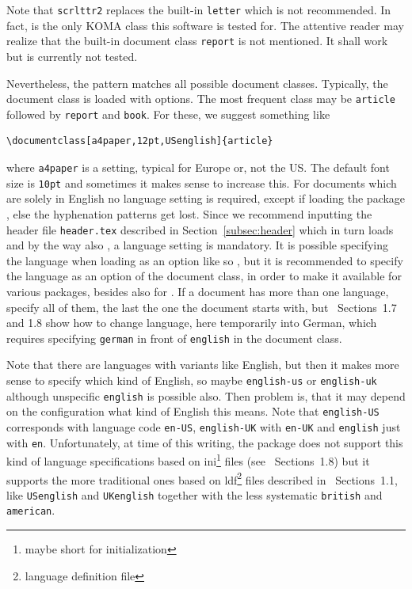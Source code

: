 Note that \texttt{scrlttr2} replaces the built-in \texttt{letter} which is not recommended. 
In fact, is the only KOMA class this software is tested for. 
The attentive reader may realize 
that the built-in document class \texttt{report} is not mentioned. 
It shall work but is currently not tested. 

Nevertheless, the pattern  
matches all possible document classes. 
Typically, the document class is loaded with options. 
The most frequent class may be \texttt{article} 
followed by \texttt{report} and \texttt{book}. 
For these, we suggest something like 
%
\begin{Verbatim}
\documentclass[a4paper,12pt,USenglish]{article}
\end{Verbatim}
%
where \texttt{a4paper} is a setting, typical for Europe or, not the US\@. 
The default font size is \texttt{10pt} and sometimes it makes sense to increase this. 
For documents which are solely in English no language setting is required, 
except if loading the package , else the hyphenation patterns get lost. 
Since we recommend inputting the header file \texttt{header.tex} 
described in Section~\ref{subsec:header} which in turn loads  and 
by the way also , a language setting is mandatory. 
It is possible specifying the language when loading  as an option 
like so , 
but it is recommended to specify the language as an option of the document class, 
in order to make it available for various packages, 
besides  also for . 
If a document has more than one language, specify all of them, 
the last the one the document starts with, 
but~\cite{BabelP24} Sections~1.7 and 1.8 show how to change language, 
here temporarily into German, 
which requires specifying \texttt{german} in front of \texttt{english} 
in the document class. 

Note that there are languages with variants like English, 
but then it makes more sense to specify which kind of English, 
so maybe \texttt{english-us} or \texttt{english-uk} 
although unspecific \texttt{english} is possible also. 
Then problem is, that it may depend on the configuration what kind of English this means. 
Note that \texttt{english-US} corresponds with language code \texttt{en-US}, 
\texttt{english-UK} with \texttt{en-UK} and \texttt{english} just with \texttt{en}. 
Unfortunately, at time of this writing, %
the package  does not support this kind of language specifications 
based on ini\footnote{maybe short for initialization} files (see~\cite{BabelP24} Sections~1.8) 
but it supports the more traditional ones based on ldf\footnote{language definition file} files 
described in~\cite{BabelP24} Sections~1.1, 
like \texttt{USenglish} and \texttt{UKenglish} 
together with the less systematic \texttt{british} and \texttt{american}. 

